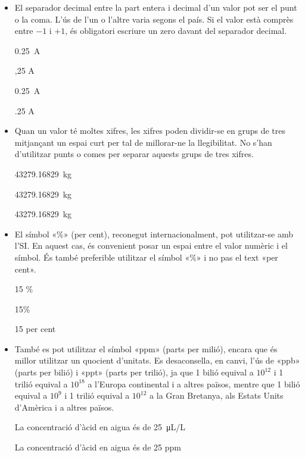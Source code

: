 \begin{itemize}
\textcolor{Green}\faCheckSquare{} $U\ped{DC} =\qty{24}{V}$

\textcolor{Red}\faTimesCircle{} $U = \qty{24}{VDC}$

\textcolor{Green}\faCheckSquare{}  $I\ped{max} = \qty{36}{kA}$

\textcolor{Red}\faTimesCircle{}   $I = \qty{36}{kA\ped{max}}$


\item El separador decimal entre la part entera i decimal d'un valor pot ser el punt o la coma. L'ús de l'un o l'altre varia segons el país. Si el valor està comprès entre $-1$ i $+1$, és obligatori escriure un zero davant del separador decimal.

\textcolor{Green}\faCheckSquare{} \qty{0,25}{A}

\textcolor{Red}\faTimesCircle{}  ,25 A

\textcolor{Green}\faCheckSquare{} \qty[output-decimal-marker = {.}]{0.25}{A}

\textcolor{Red}\faTimesCircle{}  .25 A


\item Quan un valor té moltes xifres, les xifres poden dividir-se en grups de tres mitjançant un espai curt per tal de millorar-ne la llegibilitat. No s'han d'utilitzar punts o comes per separar aquests grups de tres xifres.

\textcolor{Green}\faCheckSquare{} \qty{43279,16829}{kg}

\textcolor{Green}\faCheckSquare{} \qty[group-separator =]{43279,16829}{kg}

\textcolor{Red}\faTimesCircle{}  \qty[group-separator = .]{43279,16829}{kg}

\item El símbol «\%» (per cent), reconegut internacionalment, pot utilitzar-se amb l'SI. En aquest cas, és convenient posar un espai entre el valor numèric i el símbol. És també preferible utilitzar el símbol «\%» i no pas el text  «per cent».

\textcolor{Green}\faCheckSquare{} 15 \%

\textcolor{Blue}\faExclamationTriangle{} 15\%

\textcolor{Blue}\faExclamationTriangle{} 15 per cent


\item També es pot utilitzar el símbol «ppm» (parts per milió), encara que és millor utilitzar un quocient d'unitats. Es desaconsella, en canvi, l'ús de «ppb» (parts per bilió) i «ppt» (parts per trilió), ja que 1 bilió equival a $10^{12}$ i 1 trilió equival a $10^{18}$ a l'Europa continental i a altres països, mentre que 1 bilió equival a $10^{9}$ i 1 trilió equival a $10^{12}$ a la Gran Bretanya, als Estats Units d'Amèrica i a altres països.

\textcolor{Green}\faCheckSquare{} La concentració d'àcid en aigua és de \qty{25}{\micro L/L}

\textcolor{Blue}\faExclamationTriangle{} La concentració d'àcid en aigua és de 25 ppm

\end{itemize}


